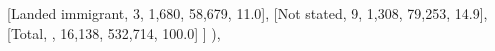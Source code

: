 \documentclass[
  11pt,
  a4paper,
]{article}
\newenvironment{Shaded}{\begin{snugshade}}{\end{snugshade}}
\newcommand{\NormalTok}[1]{\textcolor[rgb]{0.00,0.23,0.31}{#1}}
\newcommand{\StringTok}[1]{\textcolor[rgb]{0.13,0.47,0.30}{#1}}
\begin{document}
\begin{Shaded}
\begin{Highlighting}[]
\NormalTok{                    [}\StringTok{\textquotesingle{}Landed immigrant\textquotesingle{}}\NormalTok{, }\StringTok{\textquotesingle{}3\textquotesingle{}}\NormalTok{, }\StringTok{\textquotesingle{}1,680\textquotesingle{}}\NormalTok{, }\StringTok{\textquotesingle{}58,679\textquotesingle{}}\NormalTok{, }\StringTok{\textquotesingle{}11.0\textquotesingle{}}\NormalTok{],}
\NormalTok{                    [}\StringTok{\textquotesingle{}Not stated\textquotesingle{}}\NormalTok{, }\StringTok{\textquotesingle{}9\textquotesingle{}}\NormalTok{, }\StringTok{\textquotesingle{}1,308\textquotesingle{}}\NormalTok{, }\StringTok{\textquotesingle{}79,253\textquotesingle{}}\NormalTok{, }\StringTok{\textquotesingle{}14.9\textquotesingle{}}\NormalTok{],}
\NormalTok{                    [}\StringTok{\textquotesingle{}Total\textquotesingle{}}\NormalTok{, }\StringTok{\textquotesingle{}\textquotesingle{}}\NormalTok{, }\StringTok{\textquotesingle{}16,138\textquotesingle{}}\NormalTok{, }\StringTok{\textquotesingle{}532,714\textquotesingle{}}\NormalTok{, }\StringTok{\textquotesingle{}100.0\textquotesingle{}}\NormalTok{]}
\NormalTok{                ]}
\NormalTok{            ),}
            

\end{Highlighting}
\end{Shaded}
\end{document}
